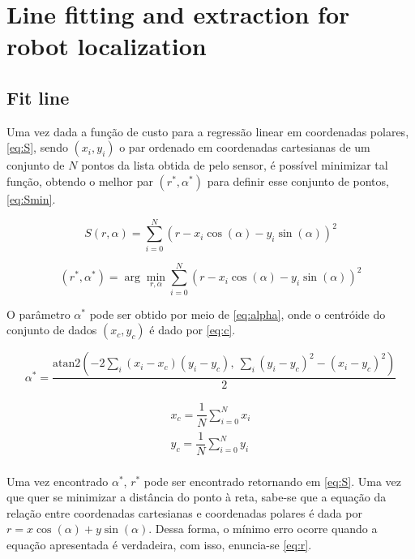 \section{Line fitting and extraction for robot localization}

\subsection{Fit line}

Uma vez dada a função de custo para a regressão linear em coordenadas polares, \eqref{eq:S}, sendo $(x_i,y_i)$ o par ordenado em coordenadas cartesianas de um conjunto de $N$ pontos da lista obtida de pelo sensor, é possível minimizar tal função, obtendo o melhor par $(r^*, \alpha^*)$ para definir esse conjunto de pontos, \eqref{eq:Smin}.

\begin{equation}\label{eq:S}
	S(r,\alpha) = \sum_{i=0}^{N}\left( r - x_i\cos(\alpha) - y_i\sin(\alpha)\right) ^2
\end{equation}

\begin{equation}\label{eq:Smin}
	(r^*, \alpha^*) = \arg \min_{r,\alpha} \sum_{i=0}^{N}\left( r - x_i\cos(\alpha) - y_i\sin(\alpha)\right) ^2
\end{equation}

O parâmetro $\alpha^*$ pode ser obtido por meio de \eqref{eq:alpha}, onde o centróide do conjunto de dados $(x_c,y_c)$ é dado por \eqref{eq:c}.

\begin{equation}\label{eq:alpha}
	\alpha^* = \dfrac{\text{atan2}\left( -2\sum_{i}\left( x_i - x_c\right) \left( y_i - y_c\right),\ \sum_{i}(y_i - y_c)^2 - (x_i - y_c)^2 \right) }{2}
\end{equation}

\begin{equation}\label{eq:c}
	\begin{split}
		x_c = \dfrac{1}{N}\sum_{i=0}^{N}x_i \\
		y_c = \dfrac{1}{N}\sum_{i=0}^{N}y_i \\
	\end{split}
\end{equation}

Uma vez encontrado $\alpha^*$, $r^*$ pode ser encontrado retornando em \eqref{eq:S}. Uma vez que quer se minimizar a distância do ponto à reta, sabe-se que a equação da relação entre coordenadas cartesianas e coordenadas polares é dada por $r = x\cos(\alpha) + y\sin(\alpha)$. Dessa forma, o mínimo erro ocorre quando a equação apresentada é verdadeira, com isso, enuncia-se \eqref{eq:r}.

